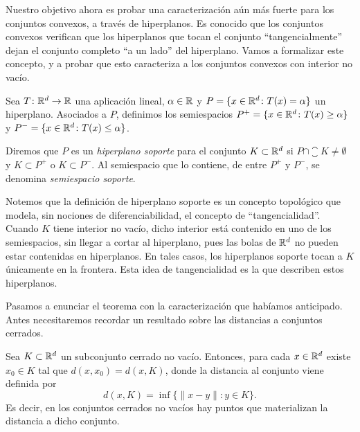 Nuestro objetivo ahora es probar una caracterización aún más fuerte para los conjuntos convexos, a través de hiperplanos. Es conocido que los conjuntos convexos verifican que los hiperplanos que tocan el conjunto ``tangencialmente'' dejan el conjunto completo ``a un lado'' del hiperplano. Vamos a formalizar este concepto, y a probar que esto caracteriza a los conjuntos convexos con interior no vacío.

\begin{definition}
    Sea $T \colon \mathbb{R}^d \to \mathbb{R}$ una aplicación lineal, $\alpha \in\mathbb{R}$ y $P = \{x \in \mathbb{R}^d \colon T(x) = \alpha \}$ un hiperplano. Asociados a $P$, definimos los semiespacios $P^+ = \{x \in \mathbb{R}^d \colon T(x) \ge \alpha \}$ y $P^- = \{x \in \mathbb{R}^d \colon T(x) \le \alpha \}$.

    Diremos que $P$ es un \emph{hiperplano soporte} para el conjunto $K \subset \mathbb{R}^d$ si $P \cap \closure{K} \ne \emptyset$ y $K \subset P^+$ o $K \subset P^-$. Al semiespacio que lo contiene, de entre $P^+$ y $P^-$, se denomina \emph{semiespacio soporte}.
\end{definition}

Notemos que la definición de hiperplano soporte es un concepto topológico que modela, sin nociones de diferenciabilidad, el concepto de ``tangencialidad''. Cuando $K$ tiene interior no vacío, dicho interior está contenido en uno de los semiespacios, sin llegar a cortar al hiperplano, pues las bolas de $\mathbb{R}^d$ no pueden estar contenidas en hiperplanos. En tales casos, los hiperplanos soporte tocan a $K$ únicamente en la frontera. Esta idea de tangencialidad es la que describen estos hiperplanos.

Pasamos a enunciar el teorema con la caracterización que habíamos anticipado. Antes necesitaremos recordar un resultado sobre las distancias a conjuntos cerrados.



\begin{prop} \label{prop:mat_dist}
    Sea $K \subset \mathbb{R}^d$ un subconjunto cerrado no vacío. Entonces, para cada $x \in \mathbb{R}^d$ existe $x_0 \in K$ tal que $d(x,x_0) = d(x,K)$, donde la distancia al conjunto viene definida por
    \[ d(x,K) = \inf\{\|x-y\| \colon y \in K \}. \]
    Es decir, en los conjuntos cerrados no vacíos hay puntos que materializan la distancia a dicho conjunto.
\end{prop}

